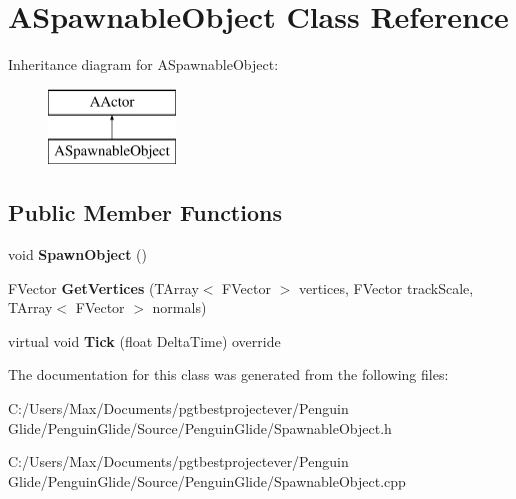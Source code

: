\hypertarget{class_a_spawnable_object}{}\section{A\+Spawnable\+Object Class Reference}
\label{class_a_spawnable_object}
Inheritance diagram for A\+Spawnable\+Object\+:\begin{figure}[H]
\begin{center}
\leavevmode
\includegraphics[height=2.000000cm]{class_a_spawnable_object}
\end{center}
\end{figure}
\subsection*{Public Member Functions}
\begin{DoxyCompactItemize}
\item 
\mbox{\label{class_a_spawnable_object_a3d8e547ac53cdf84030f95d20365816c}} 
void {\bfseries Spawn\+Object} ()
\item 
\mbox{\label{class_a_spawnable_object_a61207dbb5413abbad589966bc3913edc}} 
F\+Vector {\bfseries Get\+Vertices} (T\+Array$<$ F\+Vector $>$ vertices, F\+Vector track\+Scale, T\+Array$<$ F\+Vector $>$ normals)
\item 
\mbox{\label{class_a_spawnable_object_ab3932866cd66536c0dd8af22e910ebdc}} 
virtual void {\bfseries Tick} (float Delta\+Time) override
\end{DoxyCompactItemize}


The documentation for this class was generated from the following files\+:\begin{DoxyCompactItemize}
\item 
C\+:/\+Users/\+Max/\+Documents/pgtbestprojectever/\+Penguin Glide/\+Penguin\+Glide/\+Source/\+Penguin\+Glide/Spawnable\+Object.\+h\item 
C\+:/\+Users/\+Max/\+Documents/pgtbestprojectever/\+Penguin Glide/\+Penguin\+Glide/\+Source/\+Penguin\+Glide/Spawnable\+Object.\+cpp\end{DoxyCompactItemize}
